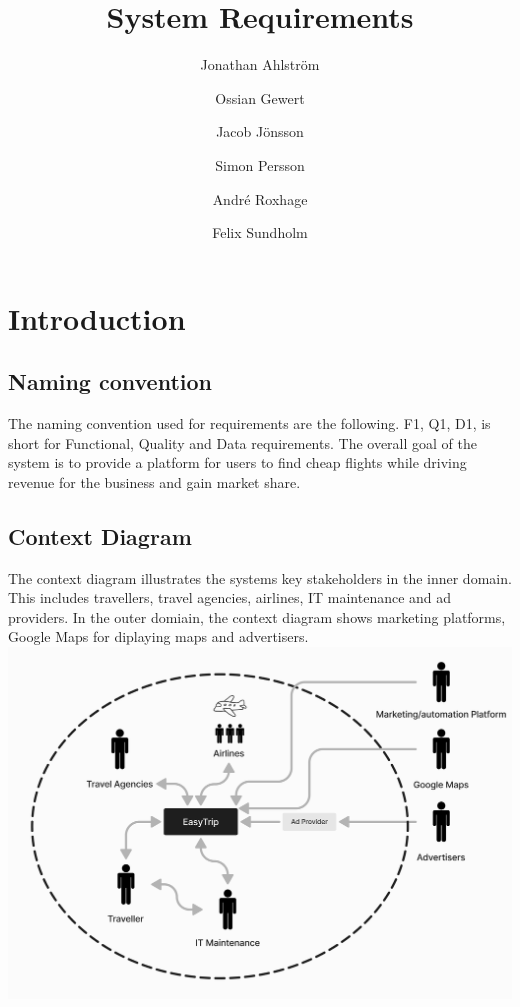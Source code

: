 \documentclass[a4paper]{article}
\title{System Requirements}
\author{Jonathan Ahlström \and Ossian Gewert \and Jacob Jönsson \and Simon Persson \and André Roxhage \and Felix Sundholm}
\begin{document}
\maketitle

\begin{center}
    
\end{center}

\newpage
\tableofcontents
\newpage

\section{Introduction}
\subsection{Naming convention}
The naming convention used for requirements are the following. F1, Q1, D1, is short for Functional, Quality and Data requirements.
The overall goal of the system is to provide a platform for users to find cheap flights while driving revenue for the business and gain market share.

\subsection{Context Diagram}
The context diagram illustrates the systems key stakeholders in the inner domain. This includes travellers, travel agencies, airlines, IT maintenance and ad providers. In the outer domiain, the context diagram shows marketing platforms, Google Maps for diplaying maps and advertisers.
\includegraphics[width=.99\textwidth]{resources/contextDiagram.png}
\end{document}
